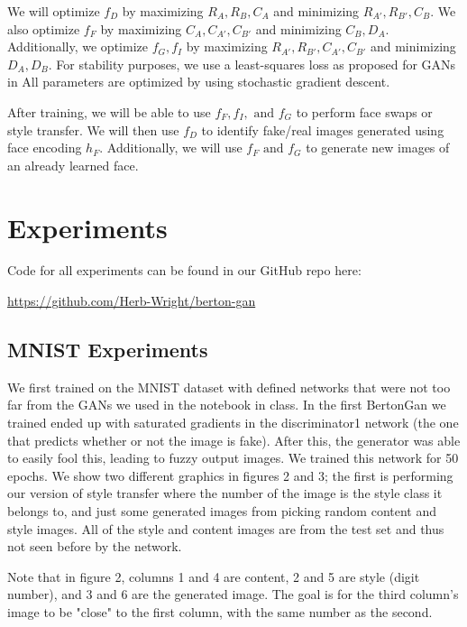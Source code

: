 \documentclass{article}
\begin{document}
We will optimize $f_D$ by maximizing $R_A, R_B, C_A$ and minimizing $R_{A'}, R_{B'}, C_B$. We also optimize $f_F$ by maximizing $C_A, C_{A'}, C_{B'}$ and minimizing $C_B, D_A$.
Additionally, we optimize $f_G, f_I$ by maximizing $R_{A'}, R_{B'}, C_{A'}, C_{B'}$ and
minimizing $D_A, D_B$.
For stability purposes, we use a least-squares loss as proposed for GANs in \cite{mao2017least}
All parameters are optimized by using stochastic gradient descent.

After training, we will be able to use $f_F, f_I, \text{ and } f_G$ to perform face swaps or style transfer. We will then use $f_D$ to identify fake/real images generated using face encoding $h_F$. Additionally, we will use $f_F \text{ and } f_G$ to generate new images of an already learned face.



\section{Experiments}

Code for all experiments can be found in our GitHub repo here:


\href{https://github.com/Herb-Wright/berton-gan}{https://github.com/Herb-Wright/berton-gan}

\subsection{MNIST Experiments}

We first trained on the MNIST dataset with defined networks that were not too far from the GANs we used in the notebook in class.
In the first BertonGan we trained ended up with saturated gradients in the discriminator1 network
(the one that predicts whether or not the image is fake).
After this, the generator was able to easily fool this, leading to fuzzy output images.
We trained this network for 50 epochs.
We show two different graphics in figures 2 and 3; the first is performing our version of style transfer
where the number of the image is the style class it belongs to,
and just some generated images from picking random content and style images.
All of the style and content images are from the test set and thus not seen before by the network.

Note that in figure 2, columns 1 and 4 are content, 2 and 5 are style (digit number), and 3 and 6 are the generated image.
The goal is for the third column's image to be "close" to the first column, with the same number as the second.
\end{document}
